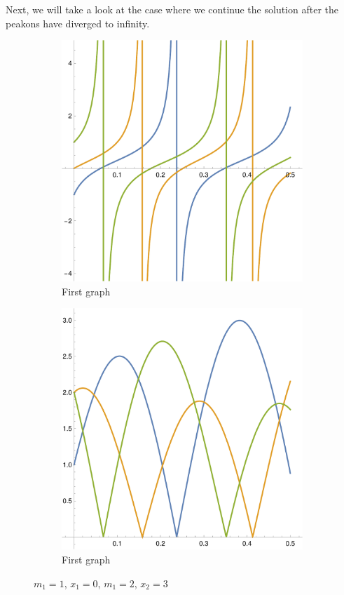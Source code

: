\documentclass[english,master]{liumaiex}
\theoremstyle{plain}
\theoremstyle{definition}
\begin{document}
Next, we will take a look at the case where we continue the solution after the peakons have diverged to infinity.
\begin{figure}[H]
	\begin{subfigure}{0.44\textwidth}
		\includegraphics[width=\textwidth]{graphs/3NInfinite/x.pdf}
        \caption{First graph}
    \end{subfigure}
	\hfill
	\begin{subfigure}{0.44\textwidth}
		\includegraphics[width=\textwidth]{graphs/3NInfinite/m.pdf}
        \caption{First graph}
    \end{subfigure}
    \caption{$m_1 = 1$, $x_1 = 0$, $m_1 = 2$, $x_2 = 3$}
	\label{fig:3N}
\end{figure}
\end{document}
